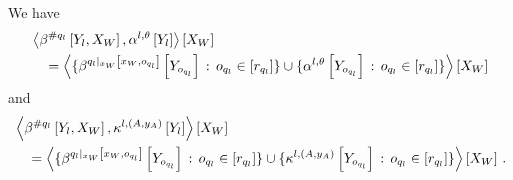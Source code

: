 \begin{lemma}
    We have
    \begin{align*}
        &\left\langle \beta^{\#q_{l}}\left[Y_{l},X_{W}\right],\alpha^{l,\theta}\left[Y_{l}\right]\right\rangle \left[ X_{W} \right] \\
        &\quad = \left\langle 
            \{\beta^{{q_{l}}|_{x_{W}} \left[x_{W},o_{q_{l}}\right]}\left[Y_{o_{q_{l}}}\right] \,:\, o_{q_{l}}\in[r_{q_{l}}]\}
            \cup
            \{\alpha^{l,\theta}\left[Y_{o_{q_{l}}}\right] \,:\, o_{q_{l}}\in[r_{q_{l}}]\}
        \right\rangle \left[ X_{W} \right]
    \end{align*}
    and
    \begin{align*}
        &\left\langle \beta^{\#q_{l}}\left[Y_{l},X_{W}\right],\kappa^{l,(A,y_{A})}\left[Y_{l}\right]\right\rangle \left[ X_{W} \right] \\
        &\quad = \left\langle 
            \{\beta^{{q_{l}}|_{x_{W}} \left[x_{W},o_{q_{l}}\right]}\left[Y_{o_{q_{l}}}\right] \,:\, o_{q_{l}}\in[r_{q_{l}}]\}
            \cup
            \{\kappa^{l,(A,y_{A})}\left[Y_{o_{q_{l}}}\right] \,:\, o_{q_{l}}\in[r_{q_{l}}]\}
        \right\rangle \left[ X_{W} \right] \, .
    \end{align*}
\end{lemma}
